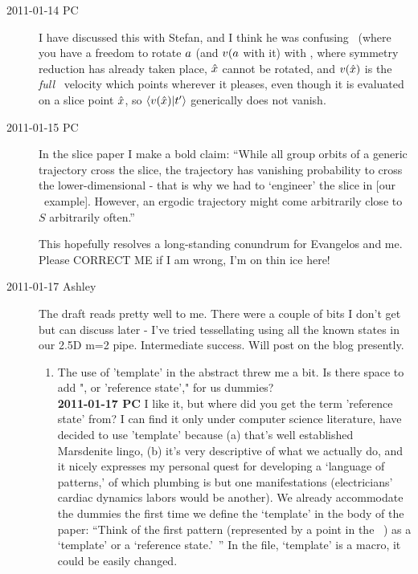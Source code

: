 \begin{description}
\item[2011-01-14 PC] I have discussed this with Stefan, and I think he
was confusing \mframes\ (where you have a freedom to rotate $a$ (and
$v(a$ with it) with \mslices, where symmetry reduction has already
taken place, $\hat{x}$ cannot be rotated, and $v(\hat{x})$ is the
\emph{full} \statesp\ velocity which points wherever it pleases, even
though it is evaluated on a slice point $\hat{x}$, so
${\braket{\vel(\sspRed)}{\sliceTan{}}}$ generically does not vanish.


\item[2011-01-15 PC] In the slice paper I make a bold claim:
``While all group orbits of a  generic trajectory cross the slice, the
trajectory has vanishing probability to cross the lower-dimensional
{\sset} - that is why we had to `engineer' the slice in [our \cLe\ example].
However, an ergodic trajectory  might come arbitrarily close to  $S$
arbitrarily often.''

This hopefully resolves a long-standing conundrum for Evangelos and me.
Please CORRECT ME if I am wrong, I'm on thin ice here!



\item[2011-01-17 Ashley]
The draft reads pretty well to me.  There were a couple of bits I don't
get but can discuss later - I've tried tessellating using all the known
states in our 2.5D m=2 pipe.  Intermediate success.  Will post on the
blog presently.

\begin{enumerate}
  \item The use of 'template' in the abstract threw me a bit.  Is there
  space to add ", or 'reference state'," for us dummies?
    \\
  {\bf 2011-01-17 PC} I like it, but where did you get
  the term 'reference state' from? I  can find it only under computer science
  literature, have decided to use 'template'  because (a) that's well
  established Marsdenite lingo,
  (b) it's very descriptive of what we actually do, and it nicely
  expresses my personal quest for developing a `language of patterns,'
  of which plumbing is but one manifestations (electricians'
  cardiac dynamics labors would be another). We already
  accommodate the dummies the
  first time we define the `template' in the body of the paper:
  ``Think of the first pattern
(represented by a point {\slicep} in the \statesp\  \pS) as a
`template' or a
`reference state.'~''
In the file, `template' is a macro, it could be easily changed.


\end{enumerate}
\end{description}

